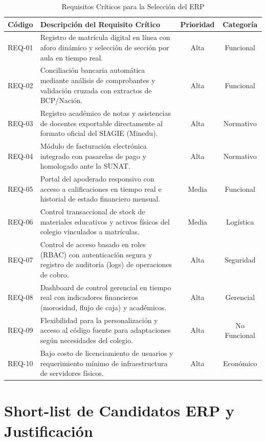 \documentclass[12pt,a4paper,oneside]{report}
\begin{document}
\begin{table}[H]
\caption{Requisitos Críticos para la Selección del ERP}
\label{tab:requisitos_criticos}
\centering\small
\begin{tabularx}{\textwidth}{l p{7.5cm} c c}
\toprule
\textbf{Código} & \textbf{Descripción del Requisito Crítico} & \textbf{Prioridad} & \textbf{Categoría} \\
\midrule
REQ-01 & Registro de matrícula digital en línea con aforo dinámico y selección de sección por aula en tiempo real. & Alta & Funcional \\
\midrule
REQ-02 & Conciliación bancaria automática mediante análisis de comprobantes y validación cruzada con extractos de BCP/Nación. & Alta & Funcional \\
\midrule
REQ-03 & Registro académico de notas y asistencias de docentes exportable directamente al formato oficial del SIAGIE (Minedu). & Alta & Normativo \\
\midrule
REQ-04 & Módulo de facturación electrónica integrado con pasarelas de pago y homologado ante la SUNAT. & Alta & Normativo \\
\midrule
REQ-05 & Portal del apoderado responsivo con acceso a calificaciones en tiempo real e historial de estado financiero mensual. & Media & Funcional \\
\midrule
REQ-06 & Control transaccional de stock de materiales educativos y activos físicos del colegio vinculados a matrículas. & Media & Logística \\
\midrule
REQ-07 & Control de acceso basado en roles (RBAC) con autenticación segura y registro de auditoría (logs) de operaciones de cobro. & Alta & Seguridad \\
\midrule
REQ-08 & Dashboard de control gerencial en tiempo real con indicadores financieros (morosidad, flujo de caja) y académicos. & Alta & Gerencial \\
\midrule
REQ-09 & Flexibilidad para la personalización y acceso al código fuente para adaptaciones según necesidades del colegio. & Alta & No Funcional \\
\midrule
REQ-10 & Bajo costo de licenciamiento de usuarios y requerimiento mínimo de infraestructura de servidores físicos. & Alta & Económico \\
\bottomrule
\end{tabularx}
\end{table}

\newpage

\section{Short-list de Candidatos ERP y Justificación}
\end{document}

